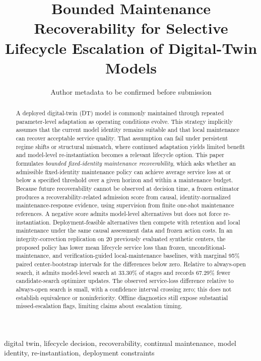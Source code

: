 \documentclass[journal]{IEEEtran}
\title{Bounded Maintenance Recoverability for Selective Lifecycle Escalation of Digital-Twin Models}
\author{Author metadata to be confirmed before submission}
\begin{document}
\maketitle
\begin{abstract}
A deployed digital-twin (DT) model is commonly maintained through repeated parameter-level adaptation as operating conditions evolve. This strategy implicitly assumes that the current model identity remains suitable and that local maintenance can recover acceptable service quality. That assumption can fail under persistent regime shifts or structural mismatch, where continued adaptation yields limited benefit and model-level re-instantiation becomes a relevant lifecycle option. This paper formulates \emph{bounded fixed-identity maintenance recoverability}, which asks whether an admissible fixed-identity maintenance policy can achieve average service loss at or below a specified threshold over a given horizon and within a maintenance budget. Because future recoverability cannot be observed at decision time, a frozen estimator produces a recoverability-related admission score from causal, identity-normalized maintenance-response evidence, using supervision from finite one-shot maintenance references. A negative score admits model-level alternatives but does not force re-instantiation. Deployment-feasible alternatives then compete with retention and local maintenance under the same causal assessment data and frozen action costs. In an integrity-correction replication on 20 previously evaluated synthetic centers, the proposed policy has lower mean lifecycle service loss than frozen, unconditional-maintenance, and verification-guided local-maintenance baselines, with marginal 95\% paired center-bootstrap intervals for the differences below zero. Relative to always-open search, it admits model-level search at 33.30\% of stages and records 67.29\% fewer candidate-search optimizer updates. The observed service-loss difference relative to always-open search is small, with a confidence interval crossing zero; this does not establish equivalence or noninferiority. Offline diagnostics still expose substantial missed-escalation flags, limiting claims about escalation timing.
\end{abstract}
\begin{IEEEkeywords}
digital twin, lifecycle decision, recoverability, continual maintenance, model identity, re-instantiation, deployment constraints
\end{IEEEkeywords}
\end{document}
